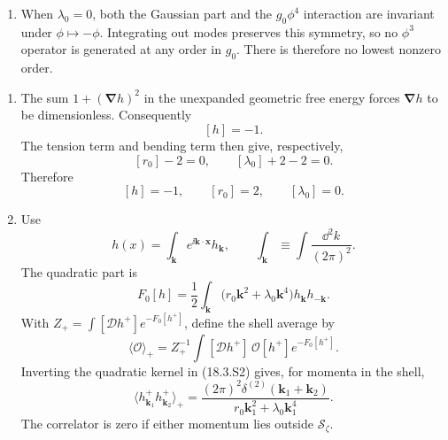 \begin{enumerate}
\begin{enumerate}
\begin{enumerate}
      \item[(iii)] When \(\lambda_0=0\), both the Gaussian part and the
      \(g_0\phi^4\) interaction are invariant under
      \(\phi\mapsto-\phi\).  Integrating out modes preserves this symmetry,
      so no \(\phi^3\) operator is generated at any order in \(g_0\).
      There is therefore no lowest nonzero order.
    \end{enumerate}
  \end{enumerate}

  \begin{enumerate}
    \item[(a)]
    The sum \(1+(\boldsymbol\nabla h)^2\) in the unexpanded geometric free
    energy forces \(\boldsymbol\nabla h\) to be dimensionless.  Consequently
    \[
      [h]=-1.
    \]
    The tension term and bending term then give, respectively,
    \[
      [r_0]-2=0,
      \qquad
      [\lambda_0]+2-2=0.
    \]
    Therefore
    \[
      \boxed{[h]=-1,\qquad [r_0]=2,\qquad [\lambda_0]=0.}
      \tag{18.3.S1}
    \]

    \item[(b)]
    Use
    \[
      h(x)=\int_{\mathbf k}e^{\ii\mathbf k\cdot\mathbf x}h_{\mathbf k},
      \qquad
      \int_{\mathbf k}\equiv\int\frac{\dd^2k}{(2\pi)^2}.
    \]
    The quadratic part is
    \[
      F_0[h]=\frac12\int_{\mathbf k}
        \bigl(r_0\mathbf k^2+\lambda_0\mathbf k^4\bigr)
        h_{\mathbf k}h_{-\mathbf k}.
      \tag{18.3.S2}
    \]
    With \(Z_+=\int[\mathcal Dh^+]e^{-F_0[h^+]}\), define the shell average
    by
    \[
      \langle\mathcal O\rangle_+
      =Z_+^{-1}\int[\mathcal Dh^+]\,\mathcal O[h^+]e^{-F_0[h^+]}.
    \]
    Inverting the quadratic kernel in (18.3.S2) gives, for momenta in the
    shell,
    \[
      \boxed{
      \bigl\langle h_{\mathbf k_1}^+h_{\mathbf k_2}^+\bigr\rangle_+
      =\frac{(2\pi)^2\delta^{(2)}
        (\mathbf k_1+\mathbf k_2)}
        {r_0\mathbf k_1^2+\lambda_0\mathbf k_1^4}.}
      \tag{18.3.S3}
    \]
    The correlator is zero if either momentum lies outside
    \(\mathcal S_\zeta\).


\end{enumerate}
\end{enumerate}

